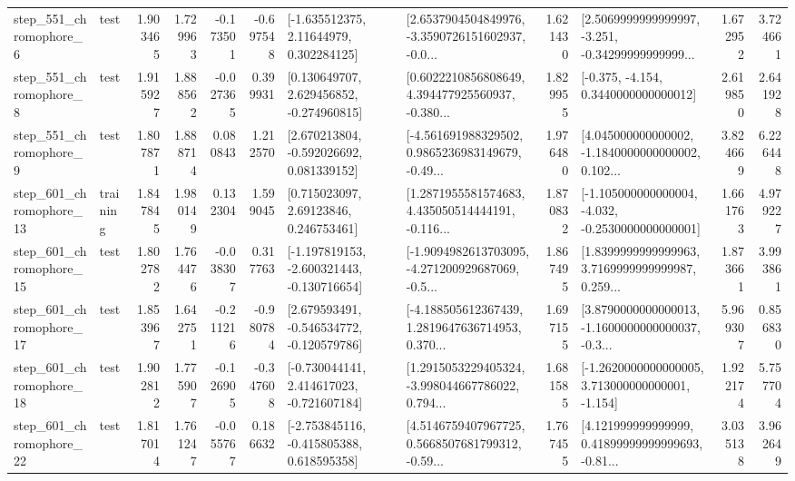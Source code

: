 \begin{tabular}{llrrrrllrlrr}
   step\_551\_chromophore\_6 &      test &      1.903465 &    1.729963 &     -0.173501 & -0.697548 &     [-1.635512375, 2.11644979, 0.302284125] &  [2.6537904504849976, -3.3590726151602937, -0.0... &       1.621430 &  [2.5069999999999997, -3.251, -0.34299999999999... &            1.672952 &          3.724661 \\
   step\_551\_chromophore\_8 &      test &      1.915927 &    1.888562 &     -0.027365 &  0.399931 &    [0.130649707, 2.629456852, -0.274960815] &  [0.6022210856808649, 4.394477925560937, -0.380... &       1.829955 &               [-0.375, -4.154, 0.3440000000000012] &            2.619850 &          2.641928 \\
   step\_551\_chromophore\_9 &      test &      1.807871 &    1.888714 &      0.080843 &  1.212570 &    [2.670213804, -0.592026692, 0.081339152] &  [-4.561691988329502, 0.9865236983149679, -0.49... &       1.976480 &  [4.045000000000002, -1.1840000000000002, 0.102... &            3.824669 &          6.226448 \\
  step\_601\_chromophore\_13 &  training &      1.847845 &    1.980149 &      0.132304 &  1.599045 &      [0.715023097, 2.69123846, 0.246753461] &  [1.2871955581574683, 4.435050514444191, -0.116... &       1.870832 &  [-1.105000000000004, -4.032, -0.2530000000000001] &            1.661763 &          4.979227 \\
  step\_601\_chromophore\_15 &      test &      1.802782 &    1.764476 &     -0.038307 &  0.317763 &  [-1.197819153, -2.600321443, -0.130716654] &  [-1.9094982613703095, -4.271200929687069, -0.5... &       1.867495 &  [1.8399999999999963, 3.7169999999999987, 0.259... &            1.873661 &          3.993861 \\
  step\_601\_chromophore\_17 &      test &      1.853967 &    1.642751 &     -0.211216 & -0.980784 &   [2.679593491, -0.546534772, -0.120579786] &  [-4.188505612367439, 1.2819647636714953, 0.370... &       1.697155 &  [3.8790000000000013, -1.1600000000000037, -0.3... &            5.969307 &          0.856830 \\
  step\_601\_chromophore\_18 &      test &      1.902812 &    1.775907 &     -0.126905 & -0.347608 &   [-0.730044141, 2.414617023, -0.721607184] &  [1.2915053229405324, -3.998044667786022, 0.794... &       1.681585 &   [-1.2620000000000005, 3.713000000000001, -1.154] &            1.922174 &          5.757704 \\
  step\_601\_chromophore\_22 &      test &      1.817014 &    1.761247 &     -0.055767 &  0.186632 &   [-2.753845116, -0.415805388, 0.618595358] &  [4.5146759407967725, 0.5668507681799312, -0.59... &       1.767455 &  [4.121999999999999, 0.41899999999999693, -0.81... &            3.035138 &          3.962649 \\

\end{tabular}
